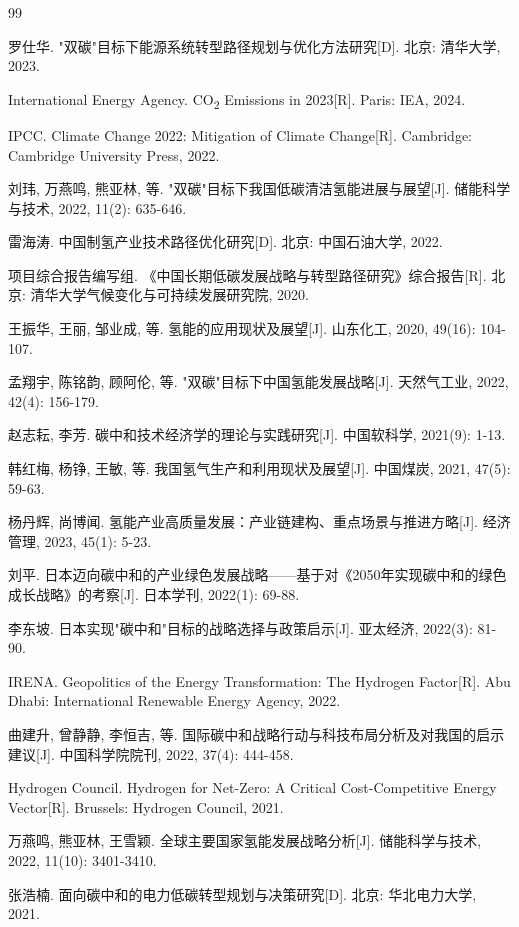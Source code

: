 \documentclass[12pt,a4paper]{ctexart}
\begin{document}
\begin{thebibliography}{99}

罗仕华. "双碳"目标下能源系统转型路径规划与优化方法研究[D]. 北京: 清华大学, 2023.

International Energy Agency. CO\textsubscript{2} Emissions in 2023[R]. Paris: IEA, 2024.

IPCC. Climate Change 2022: Mitigation of Climate Change[R]. Cambridge: Cambridge University Press, 2022.

刘玮, 万燕鸣, 熊亚林, 等. "双碳"目标下我国低碳清洁氢能进展与展望[J]. 储能科学与技术, 2022, 11(2): 635-646.

雷海涛. 中国制氢产业技术路径优化研究[D]. 北京: 中国石油大学, 2022.

项目综合报告编写组. 《中国长期低碳发展战略与转型路径研究》综合报告[R]. 北京: 清华大学气候变化与可持续发展研究院, 2020.

王振华, 王丽, 邹业成, 等. 氢能的应用现状及展望[J]. 山东化工, 2020, 49(16): 104-107.

孟翔宇, 陈铭韵, 顾阿伦, 等. "双碳"目标下中国氢能发展战略[J]. 天然气工业, 2022, 42(4): 156-179.

赵志耘, 李芳. 碳中和技术经济学的理论与实践研究[J]. 中国软科学, 2021(9): 1-13.

韩红梅, 杨铮, 王敏, 等. 我国氢气生产和利用现状及展望[J]. 中国煤炭, 2021, 47(5): 59-63.

杨丹辉, 尚博闻. 氢能产业高质量发展：产业链建构、重点场景与推进方略[J]. 经济管理, 2023, 45(1): 5-23.

刘平. 日本迈向碳中和的产业绿色发展战略——基于对《2050年实现碳中和的绿色成长战略》的考察[J]. 日本学刊, 2022(1): 69-88.

李东坡. 日本实现"碳中和"目标的战略选择与政策启示[J]. 亚太经济, 2022(3): 81-90.

IRENA. Geopolitics of the Energy Transformation: The Hydrogen Factor[R]. Abu Dhabi: International Renewable Energy Agency, 2022.

曲建升, 曾静静, 李恒吉, 等. 国际碳中和战略行动与科技布局分析及对我国的启示建议[J]. 中国科学院院刊, 2022, 37(4): 444-458.

Hydrogen Council. Hydrogen for Net-Zero: A Critical Cost-Competitive Energy Vector[R]. Brussels: Hydrogen Council, 2021.

万燕鸣, 熊亚林, 王雪颖. 全球主要国家氢能发展战略分析[J]. 储能科学与技术, 2022, 11(10): 3401-3410.

张浩楠. 面向碳中和的电力低碳转型规划与决策研究[D]. 北京: 华北电力大学, 2021.

\end{thebibliography}
\end{document}
